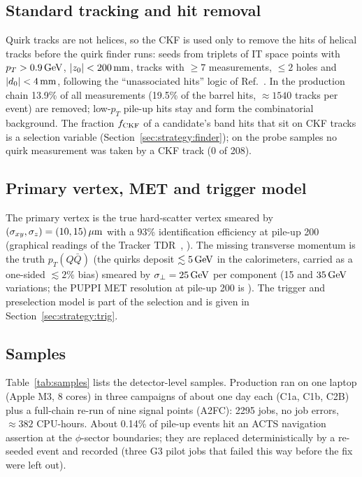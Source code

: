 \subsection{Standard tracking and hit removal}\label{sec:detector:ckf}
Quirk tracks are not helices, so the CKF is used only to remove the hits of helical tracks before the quirk finder runs:
seeds from triplets of IT space points with $p_T>0.9\,\mathrm{GeV}$, $|z_0|<200\,\mathrm{mm}$, tracks with $\ge7$ measurements, $\le2$ holes
and $|d_0|<4\,\mathrm{mm}$, following the ``unassociated hits'' logic of Ref.~\cite[Sec.~III.D]{Knapen:2017kly}. In the production chain 13.9\% of all
measurements (19.5\% of the barrel hits, $\approx1540$ tracks per event) are removed; low-$p_T$ pile-up hits stay and form the combinatorial background. The fraction $f_{\rm CKF}$
of a candidate's band hits that sit on CKF tracks is a selection variable (Section~\ref{sec:strategy:finder}); on the probe
samples no quirk measurement was taken by a CKF track (0 of 208).

\subsection{Primary vertex, MET and trigger model}\label{sec:detector:pvmet}
The primary vertex is the true hard-scatter vertex smeared by $(\sigma_{xy},\sigma_z)=(10,15)\,\mu\mathrm{m}$ with a 93\%
identification efficiency at pile-up 200 (graphical readings of the Tracker TDR~\cite{CMS:2017lum}, \UNV{}). The missing
transverse momentum is the truth $p_T(Q\bar Q)$ (the quirks deposit $\lesssim5\,\mathrm{GeV}$ in the calorimeters, carried as a
one-sided $\lesssim2\%$ bias) smeared by $\sigma_\perp=25\,\mathrm{GeV}$ per component (15 and $35\,\mathrm{GeV}$ variations; the PUPPI MET
resolution at pile-up 200 is \UNV{}). The trigger and preselection model is part of the selection and is given in
Section~\ref{sec:strategy:trig}.

\subsection{Samples}\label{sec:detector:samples}
Table~\ref{tab:samples} lists the detector-level samples. Production ran on one laptop (Apple M3, 8 cores) in three
campaigns of about one day each (C1a, C1b, C2B) plus a full-chain re-run of nine signal points (A2FC): 2295 jobs, no job
errors, $\approx382$ CPU-hours. About 0.14\% of pile-up events hit an ACTS navigation assertion at the $\phi$-sector
boundaries; they are replaced deterministically by a re-seeded event and recorded (three G3 pilot jobs that failed this way
before the fix were left out).

